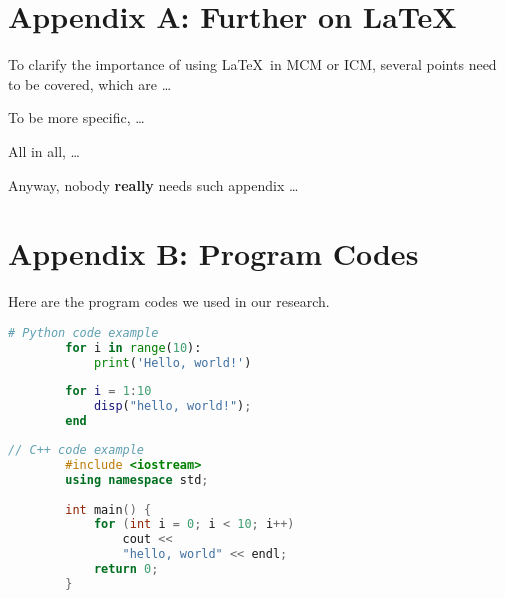 \documentclass[12pt]{article}
\begin{document}
\begin{subappendices}


	\section{Appendix A: Further on \LaTeX}
	
		To clarify the importance of using \LaTeX\ in MCM or ICM, several points need to be covered, which are \ldots
		
		To be more specific, \ldots
		
		All in all, \ldots
		
		Anyway, nobody \textbf{really} needs such appendix \ldots
	
	
	
	
	
	
	\section{Appendix B: Program Codes}
	
		Here are the program codes we used in our research.
		
		\begin{lstlisting}[language=Python, name={test.py}]
		# Python code example
		for i in range(10):
		    print('Hello, world!')
		\end{lstlisting}
		
		\begin{lstlisting}[language=MATLAB, name={test.m}]
		% MATLAB code example
		for i = 1:10
		    disp("hello, world!");
		end
		\end{lstlisting}
		
		\begin{lstlisting}[language=C++, name={test.cpp}]
		// C++ code example
		#include <iostream>
		using namespace std;
		
		int main() {
		    for (int i = 0; i < 10; i++)
		        cout << 
		        "hello, world" << endl;
		    return 0;
		}
		\end{lstlisting}
	

\end{subappendices}
\end{document}
